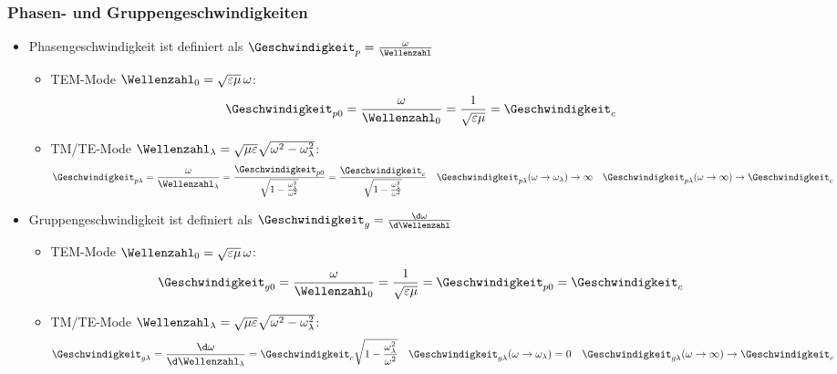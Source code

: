 \begin{frame}
  \frametitle{Phasen- und Gruppengeschwindigkeiten}
  \begin{itemize}[<+->]
  \item \alert{Phasengeschwindigkeit} ist definiert als \(\Geschwindigkeit_p = \frac{\omega}{\Wellenzahl}\)
    \begin{itemize}[<+->]
    \item TEM-Mode \(\Wellenzahl_0=\sqrt{\varepsilon\mu}\, \omega\): 
      \begin{equation*}
        \Geschwindigkeit_{p0} = \frac{\omega}{\Wellenzahl_0} = \frac{1}{\sqrt{\varepsilon\mu}} = \Geschwindigkeit_c
        \end{equation*}
      \item TM/TE-Mode \(\Wellenzahl_\lambda=\sqrt{\mu\varepsilon}\sqrt{\omega^2-\omega_\lambda^2}\):
      \begin{equation*}
        \Geschwindigkeit_{p\lambda} = \frac{\omega}{\Wellenzahl_\lambda} = \frac{\Geschwindigkeit_{p0}}{\sqrt{1-\frac{\omega_\lambda^2}{\omega^2}}} = \frac{\Geschwindigkeit_{c}}{\sqrt{1-\frac{\omega_\lambda^2}{\omega^2}}}\quad \Geschwindigkeit_{p\lambda}(\omega\to\omega_\lambda)\to\infty \quad \Geschwindigkeit_{p\lambda}(\omega\to\infty)\to\Geschwindigkeit_c 
        \end{equation*}
        
  \end{itemize}
  \item \alert{Gruppengeschwindigkeit} ist definiert als \(\Geschwindigkeit_g = \frac{\d \omega}{\d \Wellenzahl}\)
    \begin{itemize}[<+->]
    \item TEM-Mode \(\Wellenzahl_0=\sqrt{\varepsilon\mu}\, \omega\): 
      \begin{equation*}
        \Geschwindigkeit_{g0} = \frac{\omega}{\Wellenzahl_0} = \frac{1}{\sqrt{\varepsilon\mu}} = \Geschwindigkeit_{p0}=\Geschwindigkeit_c
        \end{equation*}
      \item TM/TE-Mode \(\Wellenzahl_\lambda=\sqrt{\mu\varepsilon}\sqrt{\omega^2-\omega_\lambda^2}\):
      \begin{equation*}
        \Geschwindigkeit_{g\lambda} = \frac{\d \omega}{\d \Wellenzahl_\lambda} = \Geschwindigkeit_{c} \sqrt{1-\frac{\omega_\lambda^2}{\omega^2}} \quad \Geschwindigkeit_{g\lambda}(\omega\to\omega_\lambda)=0 \quad \Geschwindigkeit_{g\lambda}(\omega\to\infty)\to\Geschwindigkeit_c 
        \end{equation*}
        
  \end{itemize}
  \end{itemize}
\end{frame}


